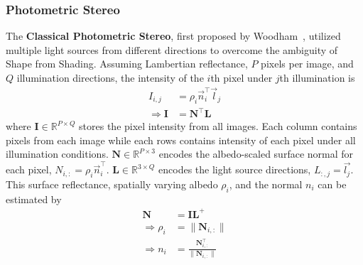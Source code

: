 



\subsubsection{Photometric Stereo}
The \textbf{Classical Photometric Stereo}, first proposed by Woodham~\cite{woodham1980photometric}, utilized multiple light sources from different directions to overcome the ambiguity of Shape from Shading. Assuming Lambertian reflectance, $P$ pixels per image, and $Q$ illumination directions, the intensity of the $i$th pixel under $j$th illumination is
\begin{align*}
I_{i,j} &= \rho_i\vec{n}_i^\top \vec{l}_j\\
\Rightarrow\mathbf{I} &= \mathbf{N}^\top \mathbf{L}
\end{align*}
where $\mathbf{I}\in \mathbb{R}^{P\times Q}$ stores the pixel intensity from all images. Each column contains pixels from each image while each rows contains intensity of each pixel under all illumination conditions. $\mathbf{N}\in \mathbb{R}^{P\times3}$ encodes the albedo-scaled surface normal for each pixel, \ie $N_{i, :} = \rho_i\vec{n}_i^\top$. $\mathbf{L} \in \mathbb{R}^{3\times Q}$ encodes the light source directions, \ie $L_{:, j} = \vec{l_j}$. This surface reflectance, \ie spatially varying albedo $\rho_i$, and the normal $n_i$ can be estimated by
\begin{align*}
\mathbf{N} &= \mathbf{I}\mathbf{L}^{+}\\
\Rightarrow\rho_i &= \|\mathbf{N}_{i,:}\|\\
\Rightarrow n_i &= \frac{\mathbf{N}_{i,:}^\top}{\|\mathbf{N}_{i,:}\|}
\end{align*}

